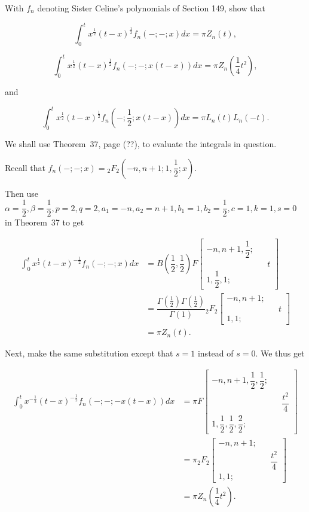 \begin{problem}\label{problem11chapter18}
With $f_n$ denoting Sister Celine's polynomials of Section 149, show that

$$\displaystyle\int_0^t x^{\frac{1}{2}}(t-x)^{\frac{1}{2}}f_n(-;-;x)dx = \pi Z_n(t),$$

$$\displaystyle\int_0^t x^{\frac{1}{2}}(t-x)^{\frac{1}{2}} f_n(-;-;x(t-x))dx = \pi Z_n \left( \dfrac{1}{4} t^2 \right),$$

and

$$\displaystyle\int_0^t x^{\frac{1}{2}}(t-x)^{\frac{1}{2}} f_n \left( -; \dfrac{1}{2};x(t-x) \right) dx = \pi L_n(t) L_n(-t).$$
\end{problem}
\begin{solution}
We shall use Theorem~37, page (??), to evaluate the integrals in question.

Recall that $f_n(-;-;x) = {}_2F_2 \left( -n, n+1; 1, \dfrac{1}{2};x \right).$

Then use $\alpha = \dfrac{1}{2}, \beta = \dfrac{1}{2}, p=2, q=2, a_1=-n, a_2=n+1, b_1=1, b_2 = \dfrac{1}{2}, c=1, k=1, s=0$ in Theorem~37 to get

$$\begin{array}{ll}
\displaystyle\int_0^t x^{\frac{1}{2}} (t-x)^{-\frac{1}{2}} f_n(-;-;x) dx &= B\left( \dfrac{1}{2}, \dfrac{1}{2} \right) F \left[ \begin{array}{rlr} 
-n, n+1, \dfrac{1}{2}; & & \\
& & t \\
1, \dfrac{1}{2}, 1; & & 
\end{array} \right] \\
&= \dfrac{\Gamma(\frac{1}{2}) \Gamma(\frac{1}{2})}{\Gamma(1)} {}_2F_2 \left[ \begin{array}{rlr} 
-n, n+1; & & \\
& & t \\
1,1; & & 
\end{array} \right] \\
&= \pi Z_n(t).
\end{array}$$

Next, make the same substitution except that $s=1$ instead of $s=0$. We thus get

$$\begin{array}{ll}
\displaystyle\int_0^t x^{-\frac{1}{2}} (t-x)^{-\frac{1}{2}} f_n(-;-;-x(t-x))dx &= \pi F \left[ \begin{array}{rlr} 
-n, n+1, \dfrac{1}{2}, \dfrac{1}{2}; & & \\
& & \dfrac{t^2}{4} \\
1, \dfrac{1}{2}, \dfrac{1}{2}, \dfrac{2}{2}; & & 
\end{array} \right] \\
&= \pi {}_2F_2 \left[ \begin{array}{rlr} 
-n, n+1; & & \\
& & \dfrac{t^2}{4} \\
1,1; & & 
\end{array} \right] \\
&= \pi Z_n \left( \dfrac{1}{4} t^2 \right).
\end{array}$$


\end{solution}
